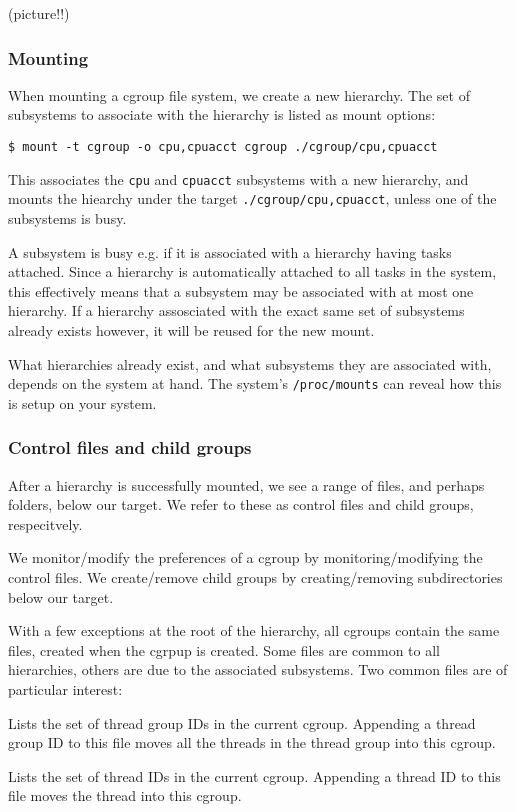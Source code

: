 (picture!!)

\subsubsection{Mounting}

When mounting a cgroup file system, we create a new hierarchy. The set of
subsystems to associate with the hierarchy is listed as mount options:

\begin{lstlisting}
$ mount -t cgroup -o cpu,cpuacct cgroup ./cgroup/cpu,cpuacct
\end{lstlisting}

This associates the \texttt{cpu} and \texttt{cpuacct} subsystems with a new
hierarchy, and mounts the hiearchy under the target
\texttt{./cgroup/cpu,cpuacct}, unless one of the subsystems is busy.

A subsystem is busy e.g. if it is associated with a hierarchy having tasks
attached.  Since a hierarchy is automatically attached to all tasks in the
system, this effectively means that a subsystem may be associated with at most
one hierarchy. If a hierarchy assosciated with the exact same set of subsystems
already exists however, it will be reused for the new mount.

What hierarchies already exist, and what subsystems they are associated with,
depends on the system at hand. The system's \texttt{/proc/mounts} can reveal
how this is setup on your system\cite{man-5-proc}.

\subsubsection{Control files and child groups}

After a hierarchy is successfully mounted, we see a range of files, and perhaps
folders, below our target. We refer to these as control files and child groups,
respecitvely.

We monitor/modify the preferences of a cgroup by monitoring/modifying the
control files. We create/remove child groups by creating/removing
subdirectories below our target.

With a few exceptions at the root of the hierarchy, all cgroups contain the
same files, created when the cgrpup is created. Some files are common to all
hierarchies, others are due to the associated subsystems. Two common files are
of particular interest:

\begin{description}[\setleftmargin{0.2in}\breaklabel\setlabelstyle{\tt}]

\item [cgroup.procs] Lists the set of thread group IDs in the current cgroup.
Appending a thread group ID to this file moves all the threads in the thread
group into this cgroup.

\item [tasks] Lists the set of thread IDs in the current cgroup. Appending a
thread ID to this file moves the thread into this cgroup.

\end{description}

